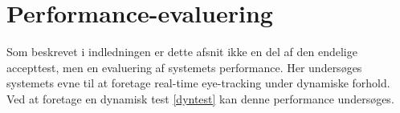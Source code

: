 \documentclass[accepttest.tex]{subfiles}
\begin{document}
	\section{Performance-evaluering}
	Som beskrevet i indledningen er dette afsnit ikke en del af den endelige accepttest, men en evaluering af systemets performance. Her undersøges systemets evne til at foretage real-time eye-tracking under dynamiske forhold. 
	Ved at foretage en dynamisk test \ref{dyntest} kan denne performance undersøges. 
\end{document}
